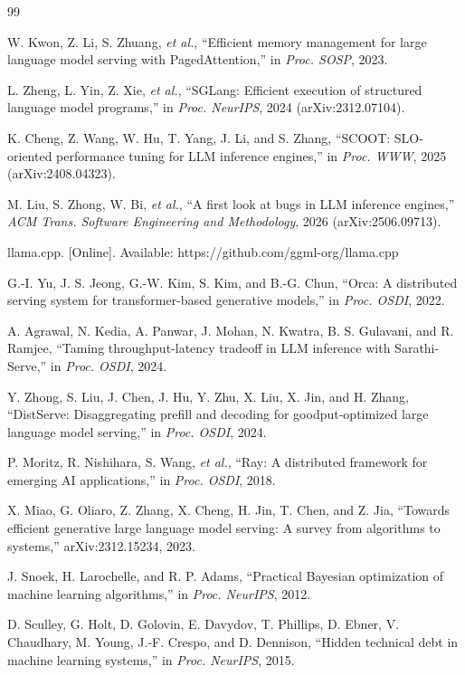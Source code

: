 \documentclass[journal]{IEEEtran}
\begin{document}
\begin{thebibliography}{99}

 W. Kwon, Z. Li, S. Zhuang, \emph{et al.}, ``Efficient memory management for large language model serving with PagedAttention,'' in \emph{Proc. SOSP}, 2023.

 L. Zheng, L. Yin, Z. Xie, \emph{et al.}, ``SGLang: Efficient execution of structured language model programs,'' in \emph{Proc. NeurIPS}, 2024 (arXiv:2312.07104).

 K. Cheng, Z. Wang, W. Hu, T. Yang, J. Li, and S. Zhang, ``SCOOT: SLO-oriented performance tuning for LLM inference engines,'' in \emph{Proc. WWW}, 2025 (arXiv:2408.04323).

 M. Liu, S. Zhong, W. Bi, \emph{et al.}, ``A first look at bugs in LLM inference engines,'' \emph{ACM Trans. Software Engineering and Methodology}, 2026 (arXiv:2506.09713).

 llama.cpp. [Online]. Available: https://github.com/ggml-org/llama.cpp

 G.-I. Yu, J. S. Jeong, G.-W. Kim, S. Kim, and B.-G. Chun, ``Orca: A distributed serving system for transformer-based generative models,'' in \emph{Proc. OSDI}, 2022.

 A. Agrawal, N. Kedia, A. Panwar, J. Mohan, N. Kwatra, B. S. Gulavani, and R. Ramjee, ``Taming throughput-latency tradeoff in LLM inference with Sarathi-Serve,'' in \emph{Proc. OSDI}, 2024.

 Y. Zhong, S. Liu, J. Chen, J. Hu, Y. Zhu, X. Liu, X. Jin, and H. Zhang, ``DistServe: Disaggregating prefill and decoding for goodput-optimized large language model serving,'' in \emph{Proc. OSDI}, 2024.

 P. Moritz, R. Nishihara, S. Wang, \emph{et al.}, ``Ray: A distributed framework for emerging AI applications,'' in \emph{Proc. OSDI}, 2018.

 X. Miao, G. Oliaro, Z. Zhang, X. Cheng, H. Jin, T. Chen, and Z. Jia, ``Towards efficient generative large language model serving: A survey from algorithms to systems,'' arXiv:2312.15234, 2023.

 J. Snoek, H. Larochelle, and R. P. Adams, ``Practical Bayesian optimization of machine learning algorithms,'' in \emph{Proc. NeurIPS}, 2012.

 D. Sculley, G. Holt, D. Golovin, E. Davydov, T. Phillips, D. Ebner, V. Chaudhary, M. Young, J.-F. Crespo, and D. Dennison, ``Hidden technical debt in machine learning systems,'' in \emph{Proc. NeurIPS}, 2015.


\end{thebibliography}
\end{document}
